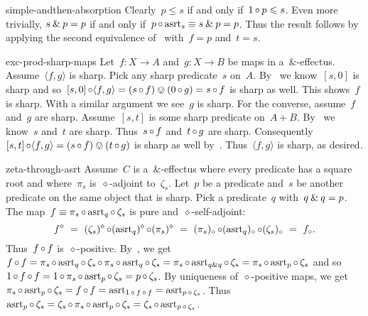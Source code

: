 \begin{solution}{simple-andthen-absorption}%
Clearly~$p \leq s$ if and only if~$1 \mathop{\circ} p \leqslant s$.
Even more trivially,  $s \mathbin{\&} p = p$
        if and only if~$p \mathop{\circ} \mathrm{asrt}_s \equiv s \mathbin{\&} p = p$.
Thus the result follows by applying the second equivalence
    of~ with~$f=p$ and~$t=s$.
\end{solution}
\begin{solution}{exc-prod-sharp-maps}%
Let~$f \colon X \to A$ and~$g\colon X \to B$
    be maps in a~$\&$-effectus.
   Assume~$\langle f, g \rangle$ is sharp.
Pick any sharp predicate~$s$ on~$A$.
By~ we know~$[s,0]$ is sharp
    and so~$[s,0] \mathop{\circ} \langle f, g \rangle = (s \mathop{\circ} f) \ovee (0 \mathop{\circ} g) = s \mathop{\circ} f$
    is sharp as well.
This shows~$f$ is sharp.
With a similar argument we see~$g$ is sharp.
For the converse, assume~$f$ and~$g$ are sharp.
    Assume~$[s,t]$ is some sharp predicate on~$A+B$.
    By~ we know~$s$ and~$t$ are sharp.
    Thus~$s \mathop{\circ} f$ and~$t \mathop{\circ} g$ are sharp.
    Consequently~$[s,t] \mathop{\circ} \langle f, g \rangle = (s \mathop{\circ} f) \ovee (t \mathop{\circ} g)$
    is sharp as well by~.
    Thus~$\langle f,g\rangle$ is sharp, as desired.
\end{solution}
\begin{solution}{zeta-through-asrt}%
Assume~$C$ is a~$\&$-effectus
    where every predicate has a square root
    and where~$\pi_s$ is~$\diamond$-adjoint to~$\zeta_s$.
Let~$p$ be a predicate and~$s$ be another predicate on the same object that is sharp.
    Pick a predicate~$q$ with~$q \mathbin{\&} q=p$.
    The map~$ f\equiv \pi_s \mathop{\circ} \mathrm{asrt}_q \mathop{\circ} \zeta_s$ is pure and~$\diamond$-self-adjoint:
\begin{equation*}
    f^\diamond
    \ =\ (\zeta_s)^\diamond \mathop{\circ} (\mathrm{asrt}_q)^\diamond \mathop{\circ} (\pi_s)^\diamond
    \ =\ (\pi_s)_\diamond \mathop{\circ} (\mathrm{asrt}_q)_\diamond \mathop{\circ} (\zeta_s)_\diamond
    \ =\ f_\diamond.
\end{equation*}
Thus~$f \mathop{\circ} f$ is~$\diamond$-positive.
By~, we get~$f \mathop{\circ} f = \pi_s \mathop{\circ} \mathrm{asrt}_q \mathop{\circ} \zeta_s \mathop{\circ} \pi_s \mathop{\circ} \mathrm{asrt}_q \mathop{\circ} \zeta_s
    = \pi_s \mathop{\circ} \mathrm{asrt}_{q \mathbin{\&} q} \mathop{\circ} \zeta_s
    = \pi_s \mathop{\circ} \mathrm{asrt}_{p} \mathop{\circ} \zeta_s$
    and so~$1 \mathop{\circ} f \mathop{\circ} f = 1 \mathop{\circ} \pi_s \mathop{\circ} \mathrm{asrt}_p \mathop{\circ}
        \zeta_s = p \mathop{\circ} \zeta_s$.
    By uniqueness of~$\diamond$-positive maps,
    we get~$\pi_s \mathop{\circ} \mathrm{asrt}_{p} \mathop{\circ} \zeta_s = f \mathop{\circ} f 
        = \mathrm{asrt}_{1 \mathop{\circ} f \mathop{\circ} f} = \mathrm{asrt}_{p \mathop{\circ} \zeta_s}$.
Thus~$\mathrm{asrt}_p \mathop{\circ} \zeta_s =
    \zeta_s \mathop{\circ} \pi_s \mathop{\circ} \mathrm{asrt}_{p} \mathop{\circ} \zeta_s
        = \zeta_s \mathop{\circ} \mathrm{asrt}_{p \mathop{\circ} \zeta_s}$.
\end{solution}
